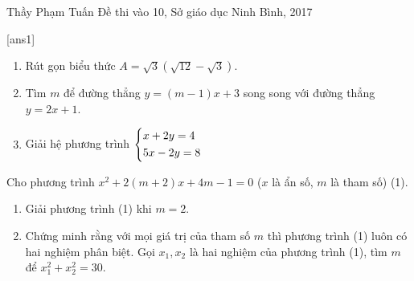 \begin{name}
{Thầy  Phạm Tuấn}
{Đề thi vào 10, Sở giáo dục Ninh Bình, 2017}
\end{name}
\setcounter{ex}{0}
[ans1]
\begin{ex}%
\hfill
\begin{enumerate}
\item Rút gọn biểu thức $A=\sqrt{3}\left(\sqrt{12}-\sqrt{3}\right)$.
\item Tìm $m$ để đường thẳng $y = (m-1)x + 3$ song song với đường thẳng $y = 2x +1$.
\item Giải hệ phương trình $\left\{\begin{aligned}&x+2y=4\\&5x-2y=8\end{aligned}\right.$
\end{enumerate}
\end{ex}

\begin{ex}%
Cho phương trình $x^2+2(m+2)x +4m-1 =0$  ($x$ là ẩn số, $m$ là tham số)  (1). 
\begin{enumerate}
\item Giải phương trình (1) khi $m=2$.
\item Chứng minh rằng với mọi giá trị của tham số $m$ thì phương trình (1) luôn có hai
nghiệm phân biệt. Gọi $x_1, x_2$ là hai nghiệm của phương trình (1), tìm $m$ để
$x_1^2+x_2^2 =30$. 
\end{enumerate}
\end{ex}

